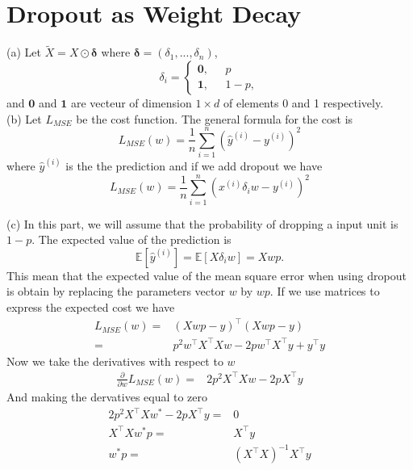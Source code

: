 \documentclass{amsart}
\newcommand{\pd}[2]{\frac{\partial #1}{\partial #2}}
\newcommand{\E}{\mathbb{E}}
\theoremstyle{definition}
\theoremstyle{remark}
\numberwithin{equation}{section}
\begin{document}
\section{Dropout as Weight Decay}
(a) Let $\tilde{X}=X\odot\bm{\delta}$ where
$\bm{\delta}=(\delta_1,...,\delta_n)$,
\begin{equation}
\delta_i=
\begin{cases}
\bm{0}, ~~~&p  \\
\bm{1}, &1-p,
\end{cases}
\end{equation}
and $\bm{0}$ and $\bm{1}$ are vecteur of dimension $1\times d$ of elements 0 and 1 respectively.\\

(b) Let $L_{MSE}$ be the cost function. The general formula for the cost is
\begin{equation}
L_{MSE}(w) = \frac{1}{n}\sum_{i=1}^n(\hat{y}^{(i)}-y^{(i)})^2
\end{equation}
where $\hat{y}^{(i)}$ is the the prediction and if we add dropout we have
\begin{equation}
\label{MSE}
L_{MSE}(w) = \frac{1}{n}\sum_{i=1}^n(x^{(i)}\delta_i w-y^{(i)})^2
\end{equation}

(c) In this part, we will assume that the probability of dropping a input unit is $1-p$. The expected value of the prediction is
\begin{equation}
\E[\hat{y}^{(i)}]=\E[X\delta_i w]=Xwp.
\end{equation}
This mean that the expected value of the mean square error when using dropout is obtain by replacing the parameters vector $w$ by $wp$. If we use matrices to express the expected cost we have
\begin{equation}
\begin{aligned}
L_{MSE}(w) =& (X wp-y)^{\top}(X wp - y)\\
=& p^2w^{\top}X^{\top}X w- 2pw^{\top}X^{\top}y + y^{\top}y
\end{aligned}
\end{equation}
Now we take the derivatives with respect to $w$
\begin{equation}
\begin{aligned}
\pd{}{w}L_{MSE}(w)
=& 2p^2X^{\top}X w- 2pX^{\top}y
\end{aligned}
\end{equation}
And making the dervatives equal to zero
\begin{equation}
\begin{aligned}
2p^2X^{\top}X w^*- 2pX^{\top}y =& 0\\
X^{\top}X w^*p =& X^{\top}y\\
w^*p =& (X^{\top}X )^{-1}X^{\top}y\\
\end{aligned}
\end{equation}
\end{document}
